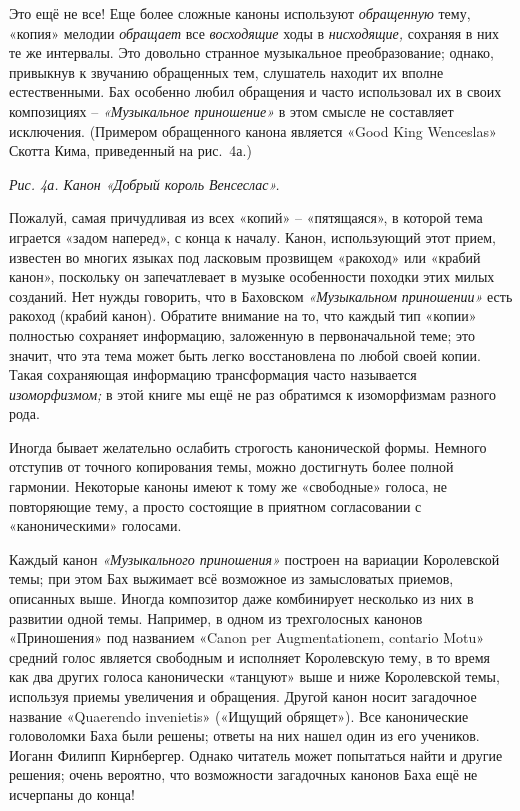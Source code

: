 \documentclass[../main.tex]{subfiles}
\begin{document}
Это ещё не все! Еще более сложные каноны используют \emph{обращенную} тему, «копия» мелодии \emph{обращает} все \emph{восходящие} ходы в \emph{нисходящие,} сохраняя в них те же интервалы. Это довольно странное музыкальное преобразование; однако, привыкнув к звучанию обращенных тем, слушатель находит их вполне естественными. Бах особенно любил обращения и часто использовал их в своих композициях \--- \emph{«Музыкальное приношение»} в этом смысле не составляет исключения. (Примером обращенного канона является «Good King Wenceslas» Скотта Кима, приведенный на рис.~4а.)

\emph{Рис. 4а. Канон «Добрый король Венсеслас».}

Пожалуй, самая причудливая из всех «копий» \--- «пятящаяся», в которой тема играется «задом наперед», с конца к началу. Канон, использующий этот прием, известен во многих языках под ласковым прозвищем «ракоход» или «крабий канон», поскольку он запечатлевает в музыке особенности походки этих милых созданий. Нет нужды говорить, что в Баховском \emph{«Музыкальном приношении»} есть ракоход (крабий канон). Обратите внимание на то, что каждый тип «копии» полностью сохраняет информацию, заложенную в первоначальной теме; это значит, что эта тема может быть легко восстановлена по любой своей копии. Такая сохраняющая информацию трансформация часто называется \emph{изоморфизмом;} в этой книге мы ещё не раз обратимся к изоморфизмам разного рода.

Иногда бывает желательно ослабить строгость канонической формы. Немного отступив от точного копирования темы, можно достигнуть более полной гармонии. Некоторые каноны имеют к тому же «свободные» голоса, не повторяющие тему, а просто состоящие в приятном согласовании с «каноническими» голосами.

Каждый канон \emph{«Музыкального приношения»} построен на вариации Королевской темы; при этом Бах выжимает всё возможное из замысловатых приемов, описанных выше. Иногда композитор даже комбинирует несколько из них в развитии одной темы. Например, в одном из трехголосных канонов «Приношения» под названием «Canon per Augmentationem, contario Motu» средний голос является свободным и исполняет Королевскую тему, в то время как два других голоса канонически «танцуют» выше и ниже Королевской темы, используя приемы увеличения и обращения. Другой канон носит загадочное название «Quaerendo invenietis» («Ищущий обрящет»). Все канонические головоломки Баха были решены; ответы на них нашел один из его учеников. Иоганн Филипп Кирнбергер. Однако читатель может попытаться найти и другие решения; очень вероятно, что возможности загадочных канонов Баха ещё не исчерпаны до конца!
\end{document}
